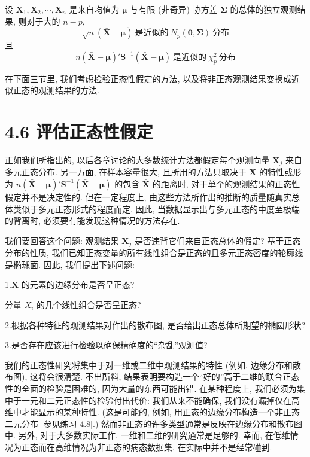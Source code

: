 \begin{mvbox}
设 $\mathbf{X}_{1},\mathbf{X}_{2},\cdots,\mathbf{X}_{n}$ 是来自均值为 $\boldsymbol{\mu}$ 与有限 (非奇异) 协方差 $\boldsymbol{\Sigma}$ 的总体的独立观测结果, 则对于大的 $n-p$,
\[
\sqrt{n}(\bar{\mathbf{X}}-\boldsymbol{\mu})\ \text{是近似的}\ N_{p}(\mathbf{0},\boldsymbol{\Sigma})\ \text{分布}
\]
且
\label{eq:4-28}
\begin{equation}
n(\bar{\mathbf{X}}-\boldsymbol{\mu})'\mathbf{S}^{-1}(\bar{\mathbf{X}}-\boldsymbol{\mu})\ \text{是近似的}\ \chi_{p}^{2}\ \text{分布} \tag{4-28}
\end{equation}
\end{mvbox}

在下面三节里, 我们考虑检验正态性假定的方法, 以及将非正态观测结果变换成近似正态的观测结果的方法.

\section{4.6 评估正态性假定}
\label{sec:4.6}

正如我们所指出的, 以后各章讨论的大多数统计方法都假定每个观测向量 $\mathbf{X}_{j}$ 来自多元正态分布. 另一方面, 在样本容量很大, 且所用的方法只取决于 $\mathbf{X}$ 的特性或形为 $n(\bar{\mathbf{X}}-\boldsymbol{\mu})'\mathbf{S}^{-1}(\bar{\mathbf{X}}-\boldsymbol{\mu})$ 的包含 $\bar{\mathbf{X}}$ 的距离时, 对于单个的观测结果的正态性假定并不是决定性的. 但在一定程度上, 由这些方法所作出的推断的质量随真实总体类似于多元正态形式的程度而定. 因此, 当数据显示出与多元正态的中度至极端的背离时, 必须要有能发现这种情况的方法存在.

我们要回答这个问题: 观测结果 $\mathbf{X}_{j}$ 是否违背它们来自正态总体的假定? 基于正态分布的性质, 我们已知正态变量的所有线性组合是正态的且多元正态密度的轮廓线是椭球面. 因此, 我们提出下述问题:

1.\quad $\mathbf{X}$ 的元素的边缘分布是否呈正态?

分量 $X_{i}$ 的几个线性组合是否呈正态?

2.\quad 根据各种特征的观测结果对作出的散布图, 是否给出正态总体所期望的椭圆形状?

3.\quad 是否存在应该进行检验以确保精确度的“杂乱”观测值?

我们的正态性研究将集中于对一维或二维中观测结果的特性 (例如, 边缘分布和散布图), 这将会很清楚. 不出所料, 结果表明要构造一个“好的”高于二维的联合正态性的全面的检验是困难的, 因为大量的东西可能出错. 在某种程度上, 我们必须为集中于一元和二元正态性的检验付出代价: 我们从来不能确保, 我们没有漏掉仅在高维中才能显示的某种特性. (这是可能的, 例如, 用正态的边缘分布构造一个非正态二元分布 [参见练习 4.8].) 然而非正态的许多类型通常是反映在边缘分布和散布图中. 另外, 对于大多数实际工作, 一维和二维的研究通常是足够的. 幸而, 在低维情况为正态而在高维情况为非正态的病态数据集, 在实际中并不是经常碰到.

